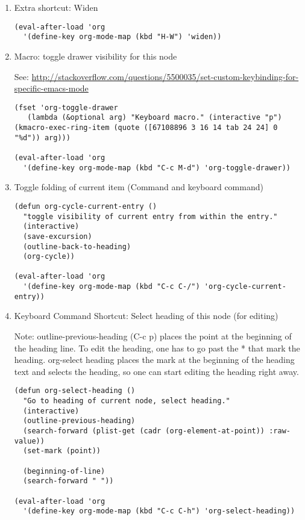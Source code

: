 \documentclass{article}
\begin{document}
\begin{enumerate}
\item Extra shortcut: Widen
\label{sec-2-5-14-1}
\begin{verbatim}
(eval-after-load 'org
  '(define-key org-mode-map (kbd "H-W") 'widen))
\end{verbatim}
\item Macro: toggle drawer visibility for this node
\label{sec-2-5-14-2}

See: \url{http://stackoverflow.com/questions/5500035/set-custom-keybinding-for-specific-emacs-mode}

\begin{verbatim}
(fset 'org-toggle-drawer
   (lambda (&optional arg) "Keyboard macro." (interactive "p") (kmacro-exec-ring-item (quote ([67108896 3 16 14 tab 24 24] 0 "%d")) arg)))

(eval-after-load 'org
  '(define-key org-mode-map (kbd "C-c M-d") 'org-toggle-drawer))
\end{verbatim}

\item Toggle folding of current item (Command and keyboard command)
\label{sec-2-5-14-3}

\begin{verbatim}
(defun org-cycle-current-entry ()
  "toggle visibility of current entry from within the entry."
  (interactive)
  (save-excursion)
  (outline-back-to-heading)
  (org-cycle))

(eval-after-load 'org
  '(define-key org-mode-map (kbd "C-c C-/") 'org-cycle-current-entry))
\end{verbatim}

\item Keyboard Command Shortcut: Select heading of this node (for editing)
\label{sec-2-5-14-4}

Note: outline-previous-heading (C-c p) places the point at the beginning of the heading line.  To edit the heading, one has to go past the * that mark the heading.  org-select heading places the mark at the beginning of the heading text and selects the heading, so one can start editing the heading right away.

\begin{verbatim}
(defun org-select-heading ()
  "Go to heading of current node, select heading."
  (interactive)
  (outline-previous-heading)
  (search-forward (plist-get (cadr (org-element-at-point)) :raw-value))
  (set-mark (point))

  (beginning-of-line)
  (search-forward " "))

(eval-after-load 'org
  '(define-key org-mode-map (kbd "C-c C-h") 'org-select-heading))
\end{verbatim}
\end{enumerate}
\end{document}

